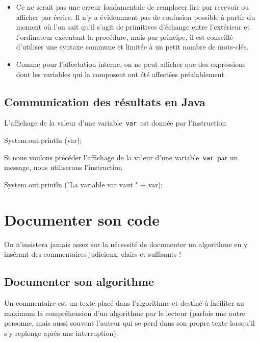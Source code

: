 \documentclass[11pt,a4paper]{article}
\begin{document}
					\begin{itemize}
				
			\item 
              Ce ne serait pas une erreur fondamentale de remplacer lire par recevoir ou afficher
              par \'ecrire. Il n'y a \'evidemment pas de confusion possible \`a partir du moment o\`u l'on
              sait qu'il s'agit de primitives d'\'echange entre l'ext\'erieur et l'ordinateur ex\'ecutant la
              proc\'edure, mais par principe, il est conseill\'e d'utiliser une syntaxe commune et limit\'ee
              \`a un petit nombre de mots-cl\'es.
            
			\item 
              Comme pour l'affectation interne, on ne peut afficher que des expressions dont les
              variables qui la composent ont \'et\'e affect\'ees pr\'ealablement.
            
					\end{itemize}
				
            \par
        \subsection{Communication des r\'esultats en Java}
          L'affichage de la valeur d'une variable \,\verb|var|\,  est donn\'ee par l'instruction
          
            \par
        \begin{Java}
 System.out.println (var);
				\end{Java}
          Si nous voulons pr\'ec\'eder l'affichage de la valeur d'une variable \,\verb|var|\,  par un message, 
          nous utiliserons l'instruction
        
            \par
        \begin{Java}
 System.out.println ("La variable var vaut " + var);
				\end{Java}\section{Documenter son code}
				On n'insistera jamais assez sur la n\'ecessit\'e de documenter un algorithme en y ins\'erant 
        des commentaires judicieux, clairs et suffisants !
      
            \par
        \subsection{Documenter son algorithme}
        Un commentaire est un texte plac\'e dans l'algorithme et destin\'e \`a faciliter au maximum 
        la compr\'ehension d'un algorithme par le lecteur (parfois une autre personne, 
        mais aussi souvent l'auteur qui se perd dans son propre texte lorsqu'il s'y replonge apr\`es une interruption). 
      
\end{document}
